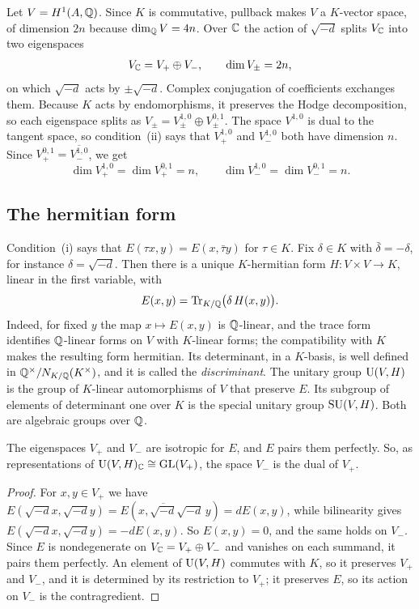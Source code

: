 Let $V=H^{1}(A,\mathbb{Q})$. Since $K$ is commutative, pullback makes $V$ a
$K$-vector space, of dimension $2n$ because $\dim_{\mathbb{Q}}V=4n$. Over $\mathbb{C}$
the action of $\sqrt{-d}$ splits $V_{\mathbb{C}}$ into two eigenspaces
\[
  V_{\mathbb{C}}=V_{+}\oplus V_{-},\qquad \dim V_{\pm}=2n,
\]
on which $\sqrt{-d}$ acts by $\pm\sqrt{-d}$. Complex conjugation of
coefficients exchanges them. Because $K$ acts by endomorphisms, it
preserves the Hodge decomposition, so each eigenspace splits as
$V_{\pm}=V_{\pm}^{1,0}\oplus V_{\pm}^{0,1}$. The space $V^{1,0}$ is dual to
the tangent space, so condition~(ii) says that $V^{1,0}_{+}$ and
$V^{1,0}_{-}$ both have dimension $n$. Since
$V^{0,1}_{+}=\overline{V^{1,0}_{-}}$, we get
\begin{equation}\label{eq:balanced}
  \dim V_{+}^{1,0}=\dim V_{+}^{0,1}=n,\qquad
  \dim V_{-}^{1,0}=\dim V_{-}^{0,1}=n .
\end{equation}

\subsection*{The hermitian form}
Condition~(i) says that $E(\tau x,y)=E(x,\bar\tau y)$ for $\tau\in K$. Fix
$\delta\in K$ with $\bar\delta=-\delta$, for instance $\delta=\sqrt{-d}$.
Then there is a unique $K$-hermitian form $H\colon V\times V\to K$, linear in
the first variable, with
\[
  E(x,y)=\operatorname{Tr}_{K/\mathbb{Q}}\bigl(\delta\,H(x,y)\bigr).
\]
Indeed, for fixed $y$ the map $x\mapsto E(x,y)$ is $\mathbb{Q}$-linear, and the
trace form identifies $\mathbb{Q}$-linear forms on $V$ with $K$-linear forms; the
compatibility with $K$ makes the resulting form hermitian. Its
determinant, in a $K$-basis, is well defined in
$\mathbb{Q}^{\times}/N_{K/\mathbb{Q}}(K^{\times})$, and it is called the
\emph{discriminant}. The unitary group $\operatorname{U}(V,H)$ is the group of
$K$-linear automorphisms of $V$ that preserve $E$. Its subgroup of elements
of determinant one over $K$ is the special unitary group $\operatorname{SU}(V,H)$. Both
are algebraic groups over $\mathbb{Q}$.

\begin{lemma}\label{lem:isotropic}
The eigenspaces $V_{+}$ and $V_{-}$ are isotropic for $E$, and $E$ pairs
them perfectly. So, as representations of $\operatorname{U}(V,H)_{\mathbb{C}}\cong\operatorname{GL}(V_{+})$,
the space $V_{-}$ is the dual of $V_{+}$.
\end{lemma}

\begin{proof}
For $x,y\in V_{+}$ we have
$E(\sqrt{-d}x,\sqrt{-d}y)=E(x,\overline{\sqrt{-d}}\sqrt{-d}\,y)=dE(x,y)$, while
bilinearity gives $E(\sqrt{-d}x,\sqrt{-d}y)=-dE(x,y)$. So $E(x,y)=0$, and
the same holds on $V_{-}$. Since $E$ is nondegenerate on
$V_{\mathbb{C}}=V_{+}\oplus V_{-}$ and vanishes on each summand, it pairs them
perfectly. An element of $\operatorname{U}(V,H)$ commutes with $K$, so it preserves
$V_{+}$ and $V_{-}$, and it is determined by its restriction to $V_{+}$; it
preserves $E$, so its action on $V_{-}$ is the contragredient.
\end{proof}

